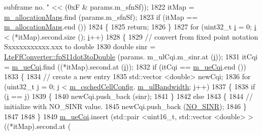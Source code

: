\begin{DoxyCode}
{       subframe no. "} << (0xF & params.m\_sfnSf));
1822         itMap = \hyperlink{classns3_1_1TdBetFfMacScheduler_a058a5b7d1c7c507d3fe3d9d12cc24ab7}{m\_allocationMaps}.find (params.m\_sfnSf);
1823         \textcolor{keywordflow}{if} (itMap == \hyperlink{classns3_1_1TdBetFfMacScheduler_a058a5b7d1c7c507d3fe3d9d12cc24ab7}{m\_allocationMaps}.end ())
1824           \{
1825             \textcolor{keywordflow}{return};
1826           \}
1827         \textcolor{keywordflow}{for} (uint32\_t \hyperlink{bernuolliDistribution_8m_a6f6ccfcf58b31cb6412107d9d5281426}{i} = 0; \hyperlink{bernuolliDistribution_8m_a6f6ccfcf58b31cb6412107d9d5281426}{i} < (*itMap).second.size (); \hyperlink{bernuolliDistribution_8m_a6f6ccfcf58b31cb6412107d9d5281426}{i}++)
1828           \{
1829             \textcolor{comment}{// convert from fixed point notation Sxxxxxxxxxxx.xxx to double}
1830             \textcolor{keywordtype}{double} sinr = \hyperlink{classns3_1_1LteFfConverter_aa5d8c2a8f988dbd63da91818c18666eb}{LteFfConverter::fpS11dot3toDouble} (params.
      m\_ulCqi.m\_sinr.at (\hyperlink{bernuolliDistribution_8m_a6f6ccfcf58b31cb6412107d9d5281426}{i}));
1831             itCqi = \hyperlink{classns3_1_1TdBetFfMacScheduler_a869067679aa0a846212a1fb509c1d702}{m\_ueCqi}.find ((*itMap).second.at (\hyperlink{bernuolliDistribution_8m_a6f6ccfcf58b31cb6412107d9d5281426}{i}));
1832             \textcolor{keywordflow}{if} (itCqi == \hyperlink{classns3_1_1TdBetFfMacScheduler_a869067679aa0a846212a1fb509c1d702}{m\_ueCqi}.end ())
1833               \{
1834                 \textcolor{comment}{// create a new entry}
1835                 std::vector <double> newCqi;
1836                 \textcolor{keywordflow}{for} (uint32\_t j = 0; j < \hyperlink{classns3_1_1TdBetFfMacScheduler_a3e53aae0259501332769cd6ca4b74800}{m\_cschedCellConfig}.
      \hyperlink{structns3_1_1FfMacCschedSapProvider_1_1CschedCellConfigReqParameters_a5ab5b102878e6e7e7727a14af4a64d2f}{m\_ulBandwidth}; j++)
1837                   \{
1838                     \textcolor{keywordflow}{if} (\hyperlink{bernuolliDistribution_8m_a6f6ccfcf58b31cb6412107d9d5281426}{i} == j)
1839                       \{
1840                         newCqi.push\_back (sinr);
1841                       \}
1842                     \textcolor{keywordflow}{else}
1843                       \{
1844                         \textcolor{comment}{// initialize with NO\_SINR value.}
1845                         newCqi.push\_back (\hyperlink{cqa-ff-mac-scheduler_8h_a520d71777be043568160c783a9c65fd5}{NO\_SINR});
1846                       \}
1847 
1848                   \}
1849                 \hyperlink{classns3_1_1TdBetFfMacScheduler_a869067679aa0a846212a1fb509c1d702}{m\_ueCqi}.insert (std::pair <uint16\_t, std::vector <double> > ((*itMap).second.at (

\end{DoxyCode}
